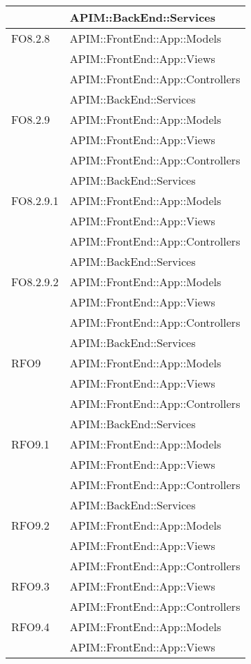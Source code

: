 \begin{longtable}{ p{4cm} | p{12cm} }
			& APIM::BackEnd::Services \\
			\hline		
			FO8.2.8
			& APIM::FrontEnd::App::Models \\
			& APIM::FrontEnd::App::Views \\
			& APIM::FrontEnd::App::Controllers \\
			& APIM::BackEnd::Services \\
			\hline	
			FO8.2.9
			& APIM::FrontEnd::App::Models \\
			& APIM::FrontEnd::App::Views \\
			& APIM::FrontEnd::App::Controllers \\
			& APIM::BackEnd::Services \\
			\hline	
			FO8.2.9.1
			& APIM::FrontEnd::App::Models \\
			& APIM::FrontEnd::App::Views \\
			& APIM::FrontEnd::App::Controllers \\
			& APIM::BackEnd::Services \\
			\hline	
			FO8.2.9.2
			& APIM::FrontEnd::App::Models \\
			& APIM::FrontEnd::App::Views \\
			& APIM::FrontEnd::App::Controllers \\
			& APIM::BackEnd::Services \\
			\hline		
			RFO9
			& APIM::FrontEnd::App::Models \\
			& APIM::FrontEnd::App::Views \\
			& APIM::FrontEnd::App::Controllers \\
			& APIM::BackEnd::Services \\
			\hline			
			RFO9.1
			& APIM::FrontEnd::App::Models \\
			& APIM::FrontEnd::App::Views \\
			& APIM::FrontEnd::App::Controllers \\
			& APIM::BackEnd::Services \\
			\hline		
			RFO9.2
			& APIM::FrontEnd::App::Models \\
			& APIM::FrontEnd::App::Views \\
			& APIM::FrontEnd::App::Controllers \\
			\hline			
			RFO9.3
			& APIM::FrontEnd::App::Views \\
			& APIM::FrontEnd::App::Controllers \\
			\hline		
			RFO9.4
			& APIM::FrontEnd::App::Models \\
			& APIM::FrontEnd::App::Views \\

\end{longtable}
